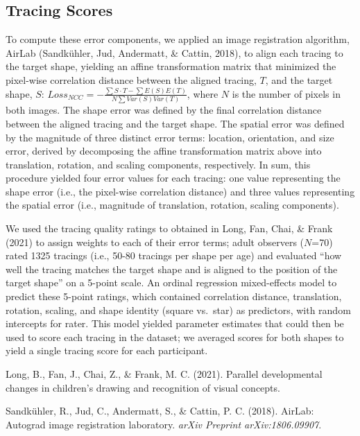 \clearpage
\makeatletter
\efloat@restorefloats
\makeatother


\begin{appendix}
\hypertarget{tracing-scores}{%
\section{Tracing Scores}\label{tracing-scores}}

To compute these error components, we applied an image registration
algorithm, AirLab (Sandkühler, Jud, Andermatt, \& Cattin, 2018), to
align each tracing to the target shape, yielding an affine
transformation matrix that minimized the pixel-wise correlation distance
between the aligned tracing, \(T\), and the target shape, \(S\):
\(Loss_{NCC} = - \frac{\sum S \cdot T - \sum E(S) E(T)}{N \sum Var(S) Var(T)}\),
where \(N\) is the number of pixels in both images. The shape error was
defined by the final correlation distance between the aligned tracing
and the target shape. The spatial error was defined by the magnitude of
three distinct error terms: location, orientation, and size error,
derived by decomposing the affine transformation matrix above into
translation, rotation, and scaling components, respectively. In sum,
this procedure yielded four error values for each tracing: one value
representing the shape error (i.e., the pixel-wise correlation distance)
and three values representing the spatial error (i.e., magnitude of
translation, rotation, scaling components).

We used the tracing quality ratings to obtained in Long, Fan, Chai, \&
Frank (2021) to assign weights to each of their error terms; adult
observers (\(N\)=70) rated 1325 tracings (i.e., 50-80 tracings per shape
per age) and evaluated ``how well the tracing matches the target shape
and is aligned to the position of the target shape'' on a 5-point scale.
An ordinal regression mixed-effects model to predict these 5-point
ratings, which contained correlation distance, translation, rotation,
scaling, and shape identity (square vs.~star) as predictors, with random
intercepts for rater. This model yielded parameter estimates that could
then be used to score each tracing in the dataset; we averaged scores
for both shapes to yield a single tracing score for each participant.

\hypertarget{refs}{}
\leavevmode\hypertarget{ref-long2021parallel}{}%
Long, B., Fan, J., Chai, Z., \& Frank, M. C. (2021). Parallel
developmental changes in children's drawing and recognition of visual
concepts.

\leavevmode\hypertarget{ref-sandkuhler2018}{}%
Sandkühler, R., Jud, C., Andermatt, S., \& Cattin, P. C. (2018). AirLab:
Autograd image registration laboratory. \emph{arXiv Preprint
arXiv:1806.09907}.
\end{appendix}
